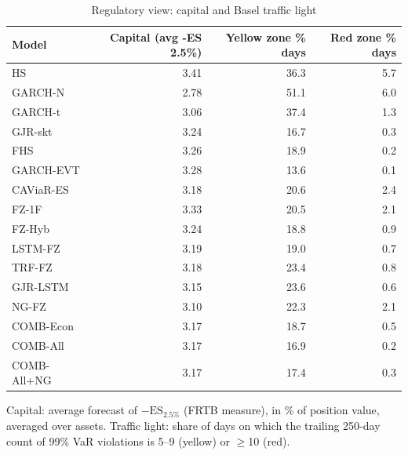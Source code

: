 \begin{table}[htbp]
\centering
\footnotesize
\caption{Regulatory view: capital and Basel traffic light}
\label{tab:reg}
\begin{tabular}{lrrr}
\toprule
Model & Capital (avg -ES 2.5\%) & Yellow zone \% days & Red zone \% days \\
\midrule
HS & 3.41 & 36.3 & 5.7 \\
GARCH-N & 2.78 & 51.1 & 6.0 \\
GARCH-t & 3.06 & 37.4 & 1.3 \\
GJR-skt & 3.24 & 16.7 & 0.3 \\
FHS & 3.26 & 18.9 & 0.2 \\
GARCH-EVT & 3.28 & 13.6 & 0.1 \\
CAViaR-ES & 3.18 & 20.6 & 2.4 \\
FZ-1F & 3.33 & 20.5 & 2.1 \\
FZ-Hyb & 3.24 & 18.8 & 0.9 \\
LSTM-FZ & 3.19 & 19.0 & 0.7 \\
TRF-FZ & 3.18 & 23.4 & 0.8 \\
GJR-LSTM & 3.15 & 23.6 & 0.6 \\
NG-FZ & 3.10 & 22.3 & 2.1 \\
COMB-Econ & 3.17 & 18.7 & 0.5 \\
COMB-All & 3.17 & 16.9 & 0.2 \\
COMB-All+NG & 3.17 & 17.4 & 0.3 \\
\bottomrule
\end{tabular}
\par\smallskip\parbox{\linewidth}{\scriptsize Capital: average forecast of $-\mathrm{ES}_{2.5\%}$ (FRTB measure), in \% of position value, averaged over assets. Traffic light: share of days on which the trailing 250-day count of 99\% VaR violations is 5--9 (yellow) or $\geq$10 (red).}
\end{table}